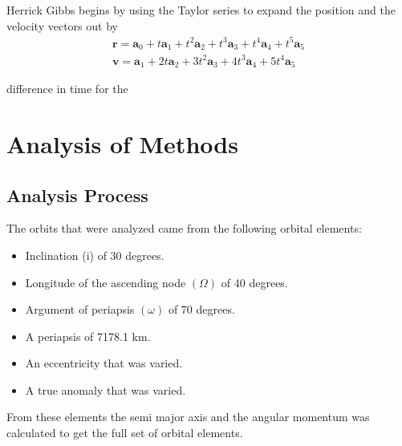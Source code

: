 \documentclass[12pt]{article}
\begin{document}
	Herrick Gibbs begins by using the Taylor series to expand the position and the velocity vectors out by 
	\begin{equation}
	\begin{array} { l } { \mathbf { r } = \mathbf { a } _ { 0 } + t \mathbf { a } _ { 1 } + t ^ { 2 } \mathbf { a } _ { 2 } + t ^ { 3 } \mathbf { a } _ { 3 } + t ^ { 4 } \mathbf { a } _ { 4 } + t ^ { 5 } \mathbf { a } _ { 5 } } \\ { \mathbf { v } = \mathbf { a } _ { 1 } + 2 t \mathbf { a } _ { 2 } + 3 t ^ { 2 } \mathbf { a } _ { 3 } + 4 t ^ { 3 } \mathbf { a } _ { 4 } + 5 t ^ { 4 } \mathbf { a } _ { 5 } } \end{array}
	\end{equation}
	
	
	
	
	difference in time for the 
	\fi
	\section{Analysis of Methods}
	\subsection{Analysis Process}
	The orbits that were analyzed came from the following orbital elements:
	\begin{itemize}\singlespacing
		\item Inclination (i) of 30 degrees.
		\item Longitude of the ascending node $(\Omega)$ of 40 degrees.
		\item Argument of periapsis $(\omega)$ of 70 degrees.
		\item A periapsis of 7178.1 km. 
		\item An eccentricity that was varied.
		\item A true anomaly that was varied.
	\end{itemize}\doublespacing
	From these elements the semi major axis and the angular momentum was calculated to get the full set of orbital elements. 
	
\end{document}
